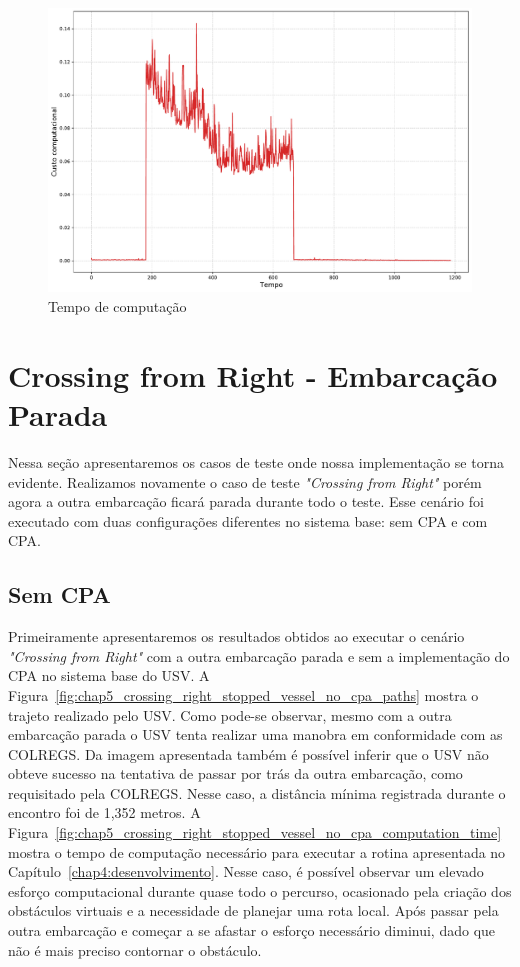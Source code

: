         \begin{figure}[H]
            \centering
            \includegraphics[width=\textwidth]{fig/chap5/crossing_right_computation_time.pdf}
            \caption{Tempo de computação}
            \label{fig:chap5_crossing_right_computation_time}
        \end{figure}
        
    \section{Crossing from Right - Embarcação Parada}
        Nessa seção apresentaremos os casos de teste onde nossa implementação se torna evidente. Realizamos novamente o caso de teste \textit{"Crossing from Right"} porém agora a outra embarcação ficará parada durante todo o teste. Esse cenário foi executado com duas configurações diferentes no sistema base: sem CPA e com CPA.
    
        \subsection{Sem CPA}
            Primeiramente apresentaremos os resultados obtidos ao executar o cenário \textit{"Crossing from Right"} com a outra embarcação parada e sem a implementação do CPA no sistema base do USV. A Figura~\ref{fig:chap5_crossing_right_stopped_vessel_no_cpa_paths} mostra o trajeto realizado pelo USV. Como pode-se observar, mesmo com a outra embarcação parada o USV tenta realizar uma manobra em conformidade com as COLREGS. Da imagem apresentada também é possível inferir que o USV não obteve sucesso na tentativa de passar por trás da outra embarcação, como requisitado pela COLREGS. Nesse caso, a distância mínima registrada durante o encontro foi de 1,352 metros. A Figura~\ref{fig:chap5_crossing_right_stopped_vessel_no_cpa_computation_time} mostra o tempo de computação necessário para executar a rotina apresentada no Capítulo~\ref{chap4:desenvolvimento}. Nesse caso, é possível observar um elevado esforço computacional durante quase todo o percurso, ocasionado pela criação dos obstáculos virtuais e a necessidade de planejar uma rota local. Após passar pela outra embarcação e começar a se afastar o esforço necessário diminui, dado que não é mais preciso contornar o obstáculo.
    
